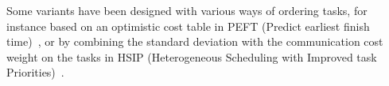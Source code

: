 \documentclass[conference]{IEEEtran}
\newcommand{\hmey}[1]{{\color{red}[HM: #1]}}
\begin{document}


Some variants have been designed with various ways of ordering tasks, for instance based
on an optimistic cost table in 
PEFT (Predict earliest finish time)~\cite{arabnejad2014list}, or by combining the standard deviation
with the communication cost weight on the tasks in HSIP (Heterogeneous Scheduling with Improved task Priorities)~\cite{wang2016hsip}. 
%
\end{document}
